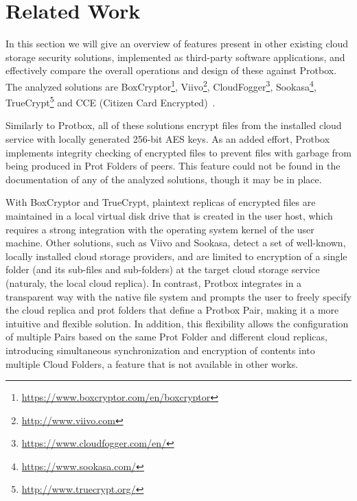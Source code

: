 \documentclass[english]{lni}
\newcommand\protbox{Protbox}
\newcommand\ProtF{Prot Folder}
\newcommand\ProtFs{Prot Folders}
\newcommand\CloudFs{Cloud Folders}
\newcommand\PPair{{\protbox} Pair}
\begin{document}
\section{Related Work}
In this section we will give an overview of features present in
other existing cloud storage security solutions, 
implemented as third-party software applications, and effectively
compare the overall operations and design of these against {\protbox}.
The analyzed solutions are
BoxCryptor\footnote{\url{https://www.boxcryptor.com/en/boxcryptor}},
Viivo\footnote{\url{http://www.viivo.com}},
CloudFogger\footnote{\url{https://www.cloudfogger.com/en/}},
Sookasa\footnote{\url{https://www.sookasa.com/}},
TrueCrypt\footnote{\url{http://www.truecrypt.org/}} and
CCE (Citizen Card Encrypted)~\cite{cce}.





Similarly to {\protbox}, all of these solutions encrypt files
from the installed cloud service with locally generated 256-bit AES keys.
As an added effort, {\protbox} implements integrity checking of encrypted
files to prevent files with garbage from being produced in {\ProtFs} of
peers. This feature could not be found in the documentation of any of the
analyzed solutions, though it may be in place.



With BoxCryptor and TrueCrypt, plaintext replicas of encrypted files
are maintained in a local virtual disk drive that is created
in the user host, which requires a
strong integration with the operating system kernel of the user
machine. Other solutions, such as Viivo and Sookasa, detect a set of well-known,
locally installed cloud storage providers, and are
limited to encryption of a single folder (and its sub-files and
sub-folders) at the target cloud storage
service (naturaly, the local cloud replica). In contrast, {\protbox}
integrates in a transparent way with the native file system and
prompts the user to freely specify the cloud replica and prot folders
that define a {\PPair}, making it a more intuitive and flexible
solution. In addition, this flexibility allows the configuration of
multiple Pairs based on the same {\ProtF} and different cloud
replicas, introducing simultaneous synchronization 
and encryption of contents into multiple {\CloudFs},
a feature that is not available in other works.
\end{document}
